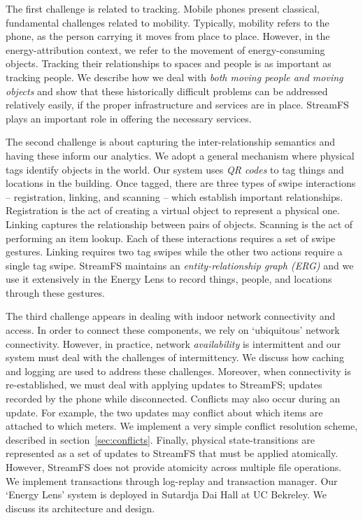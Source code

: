 The first challenge is related to tracking.  Mobile phones present classical, fundamental challenges related to mobility.  Typically, mobility
refers to the phone, as the person carrying it moves from place to place.  However, in the energy-attribution
context, we refer to the movement of energy-consuming objects.  Tracking their relationships to spaces 
and people is as important as tracking people.  We describe how we deal with \emph{both moving people and 
moving objects} and show that these historically difficult problems can be addressed relatively easily, if the proper infrastructure 
and services are in place.  StreamFS plays an important role in offering the necessary services.

The second challenge is about capturing the inter-relationship semantics and having these inform our analytics.
We adopt a general mechanism where physical tags identify objects in the world.  Our system uses \emph{QR codes} to tag things and locations 
in the building.  
Once tagged, there are three types of swipe interactions -- 
registration, linking, and scanning -- which establish important relationships.  Registration is the act of creating a virtual object 
to represent a physical one.  Linking captures the relationship between pairs of objects.  Scanning is the act of performing an item lookup.
Each of these interactions requires a set of swipe gestures.  Linking requires two tag swipes while the other two actions
require a single tag swipe.  StreamFS maintains an \emph{entity-relationship graph (ERG)} and we use it 
extensively in the Energy Lens to record things, people, and locations through these gestures.

The third challenge appears in dealing with indoor network connectivity and access.
In order to connect these components, we rely on `ubiquitous' network connectivity.  However, in practice, network
\emph{availability} is intermittent and our system must deal with the challenges of intermittency.  We discuss how caching
and logging are used to address these challenges.  Moreover, when connectivity is re-established, we must deal with
applying updates to StreamFS; updates recorded by the phone while disconnected.  
Conflicts may also occur during an update.  For example, the two updates may conflict about which items are attached
to which meters.  We implement a very simple conflict resolution scheme, described in section~\ref{sec:conflicts}.
Finally, physical state-transitions are represented as a set of updates to StreamFS that must be applied 
atomically.  However, StreamFS does not provide atomicity across multiple file operations.  We implement transactions through 
log-replay and transaction manager.  Our `Energy Lens' system is deployed in Sutardja Dai Hall at UC Bekreley.  We discuss
its architecture and design.  
  
